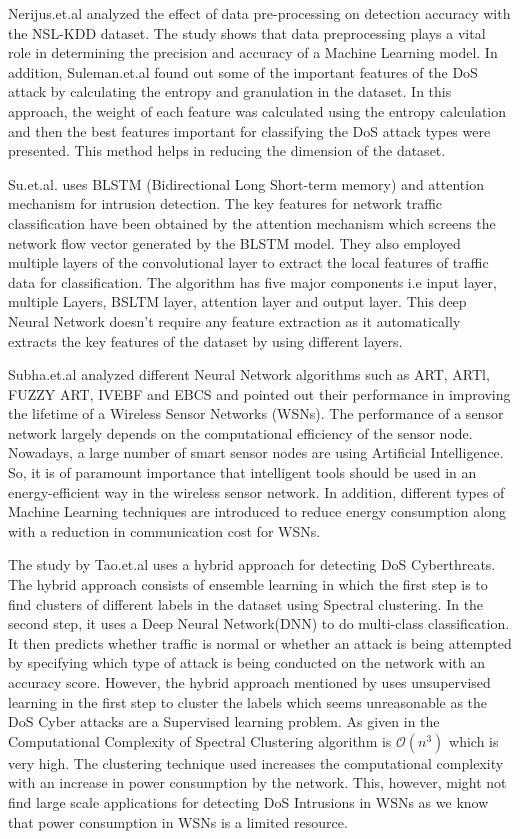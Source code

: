 \documentclass[conference]{IEEEtran}
\begin{document}
Nerijus.et.al \cite{paulauskas2017analysis} analyzed the effect of data pre-processing on detection accuracy with the NSL-KDD dataset. The study shows that data preprocessing plays a vital role in determining the precision and accuracy of a Machine Learning model. In addition, Suleman.et.al \cite{khan2018feature} found out some of the important features of the DoS attack by calculating the entropy and granulation in the dataset. In this approach, the weight of each feature was calculated using the entropy calculation and then the best features important for classifying the DoS attack types were presented. This method helps in reducing the dimension of the dataset.

Su.et.al.\cite{su2020bat} uses BLSTM (Bidirectional Long Short-term memory) and attention mechanism for intrusion detection. The key features for network traffic classification have been obtained by the attention mechanism which screens the network flow vector generated by the BLSTM model. They also employed multiple layers of the convolutional layer to extract the local features of traffic data for classification. The algorithm has five major components i.e input layer, multiple Layers, BSLTM layer, attention layer and output layer. This deep Neural Network doesn't require any feature extraction as it automatically extracts the key features of the dataset by using different layers. 

Subha.et.al\cite{subha2013survey} analyzed different Neural Network algorithms such as ART, ARTl, FUZZY ART, IVEBF and EBCS and pointed out their performance in improving the lifetime of a Wireless Sensor Networks (WSNs). The performance of a sensor network largely depends on the computational efficiency of the sensor node. Nowadays, a large number of smart sensor nodes are using Artificial Intelligence. So, it is of paramount importance that intelligent tools should be used in an energy-efficient way in the wireless sensor network. In addition, different types of Machine Learning techniques are introduced to reduce energy consumption along with a reduction in communication cost for WSNs. 

The study by Tao.et.al\cite{tao} uses a hybrid approach for detecting DoS Cyberthreats. The hybrid approach consists of ensemble learning in which the first step is to find clusters of different labels in the dataset using Spectral clustering. In the second step, it uses a Deep Neural Network(DNN) to do multi-class classification. It then predicts whether traffic is normal or whether an attack is being attempted by specifying which type of attack is being conducted on the network with an accuracy score. However, the hybrid approach mentioned by \cite{tao} uses unsupervised learning in the first step to cluster the labels which seems unreasonable as the DoS Cyber attacks are a Supervised learning problem. As given in \cite{spectral_clustering_CC} the Computational Complexity of Spectral Clustering algorithm is $\mathcal{O}(n^{3})$ which is very high. The clustering technique used increases the computational complexity with an increase in power consumption by the network. This, however, might not find large scale applications for detecting DoS Intrusions in WSNs as we know that power consumption in WSNs is a limited resource.  
\end{document}
